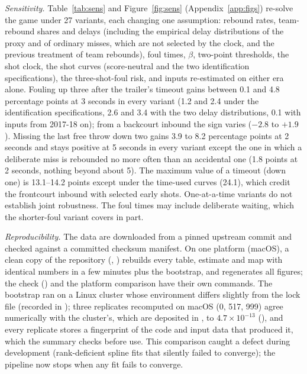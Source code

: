 \documentclass[article]{jdssv}
\begin{document}
\emph{Sensitivity.} Table~\ref{tab:sens} and Figure~\ref{fig:sens} (Appendix~\ref{app:figs}) re-solve the game under
27 variants, each changing one assumption: rebound rates, team-rebound shares and delays (including the empirical
delay distributions of the proxy and of ordinary misses, which are not selected by the clock, and the previous
treatment of team rebounds), foul times, $\beta$, two-point thresholds, the shot clock, the shot curves (score-neutral
and the two identification specifications), the three-shot-foul risk, and inputs re-estimated on either era alone.
Fouling up three after the trailer's timeout gains between 0.1 and 4.8 percentage points at 3 seconds in every
variant (1.2 and 2.4 under the identification specifications, 2.6 and 3.4 with the two delay distributions, 0.1 with
inputs from 2017-18 on); from a backcourt inbound the sign varies ($-2.8$ to $+1.9$). Missing the last free throw
down two gains 3.9 to 8.2 percentage points at 2 seconds and stays positive at 5 seconds in every variant except the
one in which a deliberate miss is rebounded no more often than an accidental one (1.8 points at 2 seconds, nothing
beyond about 5). The maximum value of a timeout (down one) is 13.1--14.2 points except under the time-used curves
(24.1), which credit the frontcourt inbound with selected early shots. One-at-a-time variants do not establish joint
robustness. The foul times may include deliberate waiting, which the shorter-foul variant covers in part.

\emph{Reproducibility.} The data are downloaded from a pinned upstream commit and checked against a committed
checksum manifest. On one platform (macOS), a clean copy of the repository (, ) rebuilds
every table, estimate and map with identical numbers in a few minutes plus the bootstrap, and regenerates all
figures; the  check () and the platform comparison have their own commands.
The bootstrap ran on a Linux cluster whose environment differs slightly from the lock file (recorded in
); three replicates recomputed on macOS (0, 517, 999) agree numerically
with the cluster's, which are deposited in , to $4.7\times10^{-13}$
(), and every replicate stores a
fingerprint of the code and input data that produced it, which the summary checks before use. This comparison
caught a defect during development (rank-deficient spline fits that silently failed to converge); the pipeline now
stops when any fit fails to converge.
\end{document}
